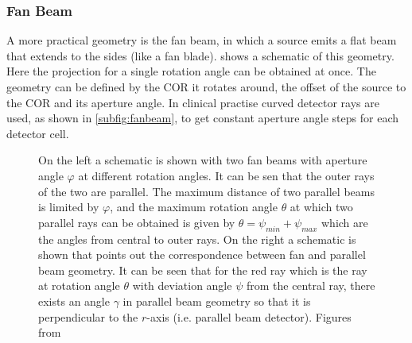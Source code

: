 \documentclass[10pt,journal,compsoc]{IEEEtran}
\begin{document}
\subsubsection{Fan Beam}\label{sssec:fanbeam}
A more practical geometry is the fan beam, in which a source emits a flat beam that extends to the sides (like a fan blade). 
 shows a schematic of this geometry.
Here the projection for a single rotation angle can be obtained at once. 
The geometry can be defined by the COR it rotates around, the offset of the source to the COR and its aperture angle.
In clinical practise curved detector rays are used, as shown in \cref{subfig:fanbeam}, to get constant aperture angle steps for each detector cell.
%
\begin{figure}[!h]
\centering
{}
\hfil
{}
\caption{
On the left a schematic is shown with two fan beams with aperture angle $\varphi$ at different rotation angles.
It can be sen that the outer rays of the two are parallel.
The maximum distance of two parallel beams is limited by $\varphi$, and the maximum rotation angle $\theta$ at which two
parallel rays can be obtained is given by $\theta = \psi_{min}+\psi_{max}$ which are the angles from central to outer rays.
On the right a schematic is shown that points out the correspondence between fan and parallel beam geometry.
It can be seen that for the red ray which is the ray at rotation angle $\theta$ with deviation angle $\psi$ from the central ray, there exists an angle $\gamma$ in parallel beam geometry so that it is perpendicular to the $r$-axis (i.e. parallel beam detector).
Figures from~\cite{Buzug2008_chap7}
}
\label{fig:rebinning}
\end{figure}
%
\end{document}
